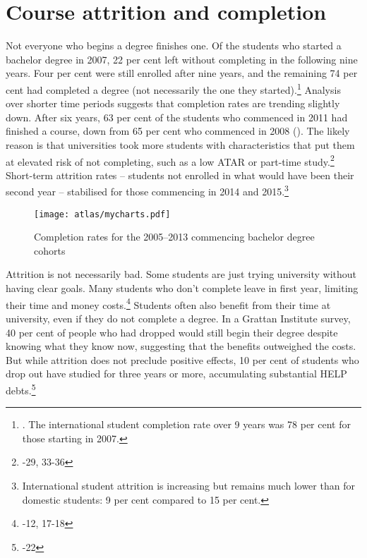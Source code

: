 \documentclass{grattan}
\begin{document}
%
\section{Course attrition and completion }\label{sec:course-attrition-and-completion}

Not everyone who begins a degree finishes one. Of the students who started a bachelor degree in 2007, 22 per cent left without completing in the following nine years. Four per cent were still enrolled after nine years, and the remaining 74 per cent had completed a degree (not necessarily the one they started).\footnote{\textcite[][]{DepartmentofEducationandTraining2017completionratesof}. The international student completion rate over 9 years was 78 per cent for those starting in 2007.} Analysis over shorter time periods suggests that completion rates are trending slightly down. After six years, 63 per cent of the students who commenced in 2011 had finished a course, down from 65 per cent who commenced in 2008 (). The likely reason is that universities took more students with characteristics that put them at elevated risk of not completing, such as a low ATAR or part-time study.\footnote{\textcite[][24]{Norton2018droppingouttheb}-29, 33-36} Short-term attrition rates -- students not enrolled in what would have been their second year -- stabilised for those commencing in 2014 and 2015.\footnote{\textcite[][appendix~4.1.]{DepartmentofEducationandTraining2017totalresourcingfo} International student attrition is increasing but remains much lower than for domestic students: 9 per cent compared to 15 per cent.}

    \begin{figure} %
    \caption{Completion rates for the 2005--2013 commencing bachelor degree cohorts}\label{fig:completion-rates-for-the-20052013-commencing-bachelor-degree-cohorts}
    \units{}
    \texttt{[image: atlas/mycharts.pdf]}
    \end{figure}
Attrition is not necessarily bad. Some students are just trying university without having clear goals. Many students who don't complete leave in first year, limiting their time and money costs.\footnote{\textcite[][8]{Norton2018droppingouttheb}-12, 17-18} Students often also benefit from their time at university, even if they do not complete a degree. In a Grattan Institute survey, 40 per cent of people who had dropped would still begin their degree despite knowing what they know now, suggesting that the benefits outweighed the costs. But while attrition does not preclude positive effects, 10 per cent of students who drop out have studied for three years or more, accumulating substantial HELP debts.\footnote{\textcite[][16]{Norton2018droppingouttheb}-22}
\end{document}

